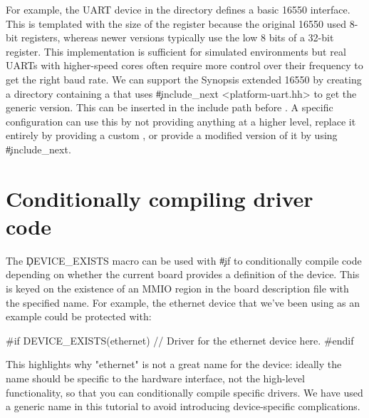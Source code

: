 For example, the UART device in the  directory defines a basic 16550 interface.
This is templated with the size of the register because the original 16550 used 8-bit registers, whereas newer versions typically use the low 8 bits of a 32-bit register.
This implementation is sufficient for simulated environments but real UARTs with higher-speed cores often require more control over their frequency to get the right baud rate.
We can support the Synopsis extended 16550 by creating a  directory containing a  that uses \c{#include_next <platform-uart.hh>} to get the generic version.
This can be inserted in the include path before .
A specific configuration can use this by not providing anything at a higher level, replace it entirely by providing a custom , or provide a modified version of it by using \c{#include_next}.

\section{Conditionally compiling driver code}

The \c{DEVICE_EXISTS} macro can be used with \c{#if} to conditionally compile code depending on whether the current board provides a definition of the device.
This is keyed on the existence of an MMIO region in the board description file with the specified name.
For example, the ethernet device that we've been using as an example could be protected with:

\begin{cxxsnippet}
#if DEVICE_EXISTS(ethernet)
// Driver for the ethernet device here.
#endif
\end{cxxsnippet}

\begin{note}
This highlights why "ethernet" is not a great name for the device: ideally the name should be specific to the hardware interface, not the high-level functionality, so that you can conditionally compile specific drivers.
We have used a generic name in this tutorial to avoid introducing device-specific complications.
\end{note}
